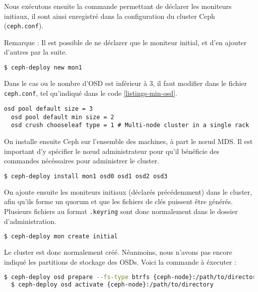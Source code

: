Nous exécutons ensuite la commande permettant de déclarer les moniteurs initiaux, il sont ainsi enregistré dans la configuration du cluster Ceph (\verb|ceph.conf|).

Remarque : Il est possible de ne déclarer que le moniteur initial, et d'en ajouter d'autres par la suite.
\vspace{3mm}
\begin{lstlisting}[language=bash]
  $ ceph-deploy new mon1
\end{lstlisting}

Dans le cas ou le nombre d'OSD est inférieur à 3, il faut modifier dans le fichier \verb|ceph.conf|, tel qu'indiqué dans le code \ref{listings-min-osd}.
\lstset{keywordstyle=\ttfamily}
\vspace{3mm}
\begin{lstlisting}[caption={Congifuration de Ceph dans le cas d'un faible nombre d'OSD.},label={listings-min-osd}]
  osd pool default size = 3
  osd pool default min size = 2
  osd crush chooseleaf type = 1 # Multi-node cluster in a single rack
\end{lstlisting}

On installe ensuite Ceph sur l'ensemble des machines, à part le nœud MDS. Il est important d'y spécifier le nœud administrateur pour qu'il bénéficie des commandes nécéssaires pour administrer le cluster.

\vspace{3mm}
\begin{lstlisting}[language=bash]
  $ ceph-deploy install mon1 osd0 osd1 osd2 osd3
\end{lstlisting}

On ajoute ensuite les moniteurs initiaux (déclarés précédemment) dans le cluster, afin qu'ils forme un quorum et que les fichiers de clés puissent être générés. Plusieurs fichiers au format \verb|.keyring| sont donc normalement dans le dossier d'administration.

\vspace{3mm}
\begin{lstlisting}[language=bash]
  $ ceph-deploy mon create initial
\end{lstlisting}

Le cluster est donc normalement créé. Néanmoins, nous n'avons pas encore indiqué les partitions de stockage des OSDs. Voici la commande à éxecuter :

\vspace{3mm}
\begin{lstlisting}[language=bash]
  $ ceph-deploy osd prepare --fs-type btrfs {ceph-node}:/path/to/directory
  $ ceph-deploy osd activate {ceph-node}:/path/to/directory
\end{lstlisting}

